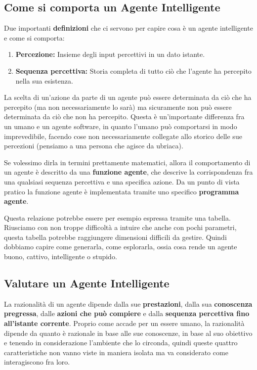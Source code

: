     \subsection{Come si comporta un Agente Intelligente}
    
        Due importanti \textbf{definizioni} che ci servono per capire cosa è un agente intelligente e come si comporta:
        \begin{enumerate}
            \item \textbf{Percezione:} Insieme degli input percettivi in un dato istante.
            \item \textbf{Sequenza percettiva:} Storia completa di tutto ciò che l'agente ha percepito nella sua esistenza.
        \end{enumerate}
        
        La scelta di un'azione da parte di un agente può essere determinata da ciò che ha percepito (ma non necessariamente lo sarà) ma sicuramente non può essere determinata da ciò che non ha percepito. Questa è un'importante differenza fra un umano e un agente software, in quanto l'umano può comportarsi in modo imprevedibile, facendo cose non necessariamente collegate allo storico delle sue percezioni (pensiamo a una persona che agisce da ubriaca).
        
        Se volessimo dirla in termini prettamente matematici, allora il comportamento di un agente è descritto da una \textbf{funzione agente}, che descrive la corrispondenza fra una qualsiasi sequenza percettiva e una specifica azione. Da un punto di vista pratico la funzione agente è implementata tramite uno specifico \textbf{programma agente}.
        
        Questa relazione potrebbe essere per esempio espressa tramite una tabella. Riusciamo con non troppe difficoltà a intuire che anche con pochi parametri, questa tabella potrebbe raggiungere dimensioni difficili da gestire. Quindi dobbiamo capire come generarla, come esplorarla, ossia cosa rende un agente buono, cattivo, intelligente o stupido.
        
    \subsection{Valutare un Agente Intelligente}
        La razionalità di un agente dipende dalla sue \textbf{prestazioni}, dalla sua \textbf{conoscenza pregressa}, dalle \textbf{azioni che può compiere} e dalla \textbf{sequenza percettiva fino all'istante corrente}. Proprio come accade per un essere umano, la razionalità dipende da quanto è razionale in base alle sue conoscenze, in base al suo obiettivo e tenendo in considerazione l'ambiente che lo circonda, quindi queste quattro caratteristiche non vanno viste in maniera isolata ma va considerato come interagiscono fra loro.
        
